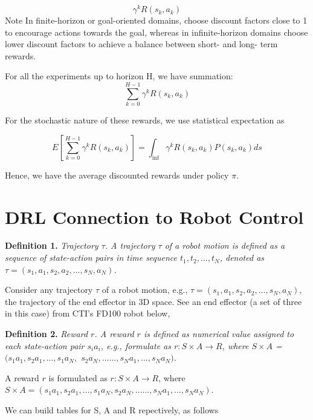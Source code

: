 \documentclass[conference]{IEEEtran}
\begin{document}
\begin{equation} 
{\gamma}^k R (s_k, a_k) 
\end{equation}   
Note In finite-horizon
or goal-oriented domains, choose discount factors close to 1 
to encourage actions towards the goal,
whereas in infinite-horizon domains choose lower discount factors
to achieve a balance between short- and long-
term rewards.

For all the experiments up to horizon H, we have summation: 
\begin{equation}    
\displaystyle\sum_{k=0}^{H-1} {\gamma}^k R (s_k, a_k) 
\end{equation}
 
For the stochastic nature of these rewards, we use
statistical expectation as

\begin{equation}  
E [\sum_{k=0}^{H-1} {\gamma}^k R (s_k, a_k) ]
=
\int_{\inf}  {\gamma}^k R (s_k, a_k) P(s_k, a_k) ds 
\end{equation}   

Hence, we have the average discounted 
rewards under policy $\pi$.    


\section{DRL Connection to Robot Control}

\textbf{Definition 1.} 
\textit{Trajectory $\tau$. 
A trajectory $\tau$ of a robot motion is defined as 
a sequence of state-action pairs in time sequence 
$t_1, t_2, ..., t_N$, denoted as 
$\tau = (s_1,a_1,s_2,a_2,...,s_N,a_N)$. 
} 
 
Consider any trajectory $\tau$ of a robot motion, e.g.,
$\tau = (s_1,a_1,s_2,a_2,...,s_N,a_N)$, 
the trajectory of the end effector in 3D space. 
See an end effector 
(a set of three in this case) from CTI's FD100 robot below, 



\textbf{Definition 2.} 
\textit{Reward $r$. 
A reward $r$ is defined as numerical value assigned to each 
state-action pair $s_i a_i$, e.g., formulate as 
$r: S \times A \rightarrow R$, where 
$S \times A $ = $(s_1 a_1, s_2 a_1, ..., s_1 a_N,$ 
$s_2 a_N, ......,s_N a_1,..., s_N a_N)$. 
} 
 

A reward $r$ is formulated as 
$r: S \times A \rightarrow R$, where 
$S \times A = (s_1 a_1, s_2 a_1, ..., s_1 a_N, s_2 a_N, ......,s_N a_1,..., s_N a_N)$.

We can build tables for S, A and R repectively, as follows 
\end{document}
